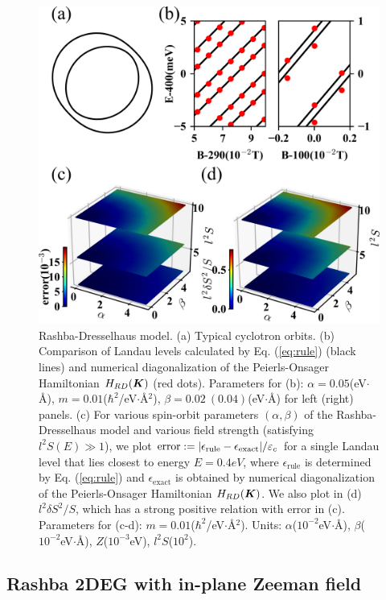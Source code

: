 \documentclass[aps, prb, showpacs, twocolumn, notitlepage, superscriptaddress]{revtex4-1}
\begin{document}
\begin{figure}
\includegraphics[width=1.0\columnwidth]{RD.png}
\caption{Rashba-Dresselhaus model. (a) Typical cyclotron orbits. (b) Comparison of Landau levels calculated by Eq. (\ref{eq:rule}) (black lines) and numerical diagonalization of the Peierls-Onsager Hamiltonian  $H_{RD}(\boldsymbol{K})$ (red dots). Parameters for (b): $\alpha=0.05$(eV$\cdot$\AA), $m=0.01$($\hbar^2$/eV$\cdot$\AA$^2$), $\beta=0.02~(0.04)$(eV$\cdot$\AA) for left (right) panels. (c) For various spin-orbit parameters $(\alpha,\beta)$ of the Rashba-Dresselhaus model and various field strength (satisfying $l^2S(E)\gg 1$), we plot  $\text{error}:=|\epsilon_\text{rule}-\epsilon_\text{exact}|/\varepsilon_c$ for a single Landau level that lies closest to energy $E=0.4eV$, where $\epsilon_\text{rule}$ is determined by Eq. (\ref{eq:rule}) and $\epsilon_{\text{exact}}$ is obtained by numerical diagonalization of the Peierls-Onsager Hamiltonian  $H_{RD}(\boldsymbol{K})$. We also plot in (d) $l^2\delta S^2/S$, which has a strong positive relation with error in (c). Parameters for (c-d): $m=0.01$($\hbar^2$/eV$\cdot$\AA$^2$). Units: $\alpha$($10^{-2}$eV$\cdot$\AA), $\beta$($10^{-2}$eV$\cdot$\AA), $Z$($10^{-3}$eV), $l^2 S$($10^2$).\label{fig:RD}}
\end{figure}

\subsection{Rashba 2DEG with in-plane Zeeman field}
\end{document}
